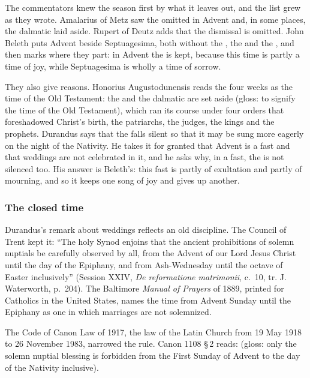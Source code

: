 The commentators knew the season first by what it leaves out, and the list grew as they wrote.
Amalarius of Metz saw the  omitted in Advent and, in some places, the
dalmatic laid aside. Rupert of Deutz adds that the dismissal  is omitted.
John Beleth puts Advent beside Septuagesima, both without the , the
 and the , and then marks where they part: in
Advent the  is kept, because this time is partly a time of joy, while
Septuagesima is wholly a time of sorrow.

They also give reasons. Honorius Augustodunensis reads the four weeks as the time of the Old
Testament: the  and the dalmatic are set aside  (gloss: to signify the time of the Old Testament), which ran its course under four
orders that foreshadowed Christ's birth, the patriarchs, the judges, the kings and the prophets.
Durandus says that the  falls silent so that it may be sung more eagerly on the
night of the Nativity. He takes it for granted that Advent is a fast and that weddings are not
celebrated in it, and he asks why, in a fast, the  is not silenced too. His answer
is Beleth's: this fast is partly of exultation and partly of mourning, and so it keeps one song
of joy and gives up another.

\subsubsection{The closed time}

Durandus's remark about weddings reflects an old discipline. The Council of Trent kept it: ``The
holy Synod enjoins that the ancient prohibitions of solemn nuptials be carefully observed by all,
from the Advent of our Lord Jesus Christ until the day of the Epiphany, and from Ash-Wednesday
until the octave of Easter inclusively'' (Session XXIV, \textit{De reformatione matrimonii},
c.~10, tr. J. Waterworth, p.~204). The Baltimore \textit{Manual of Prayers} of 1889, printed for
Catholics in the United States, names the time from Advent Sunday until the Epiphany as one in
which marriages are not solemnized.

The Code of Canon Law of 1917, the law of the Latin Church from 19 May 1918 to 26 November 1983,
narrowed the rule. Canon 1108 \S\,2 reads:  (gloss: only the solemn
nuptial blessing is forbidden from the First Sunday of Advent to the day of the Nativity
inclusive).

